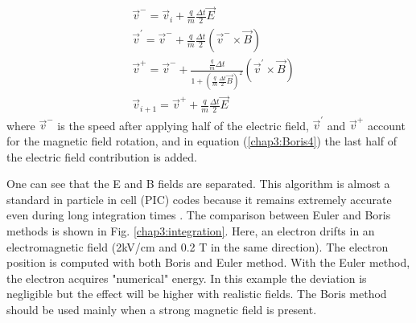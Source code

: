 \begin{refsection}
\begin{align}
     & \vec{v}^{-} = \vec{v}_{i} + \frac{q}{m} \frac{\Delta t}{2}\vec{E}                                                                 \\
     & \vec{v}^{'} = \vec{v}^{-} + \frac{q}{m} \frac{\Delta t}{2}(\vec{v}^{-} \times \vec{B})                                            \\
     & \vec{v}^{+} = \vec{v}^{-} + \frac{\frac{q}{m}\Delta t}{1+(\frac{q}{m} \frac{\Delta t}{2}\vec{B})^{2}}(\vec{v}^{'} \times \vec{B}) \\
     & \vec{v}_{i+1} = \vec{v}^{+} + \frac{q}{m} \frac{\Delta t}{2}\vec{E} \label{chap3:Boris4}
  \end{align}
  where $\vec{v}^{-}$ is the speed after applying half of the electric field, $\vec{v}^{'}$ and $\vec{v}^{+}$ account for the magnetic field rotation, and in equation (\ref{chap3:Boris4}) the last half of the electric field contribution is added.

  One can see that the E and B fields are separated. This algorithm is almost a standard in particle in cell (PIC) codes because it remains extremely accurate even during long integration times \cite{Qin2013}. The comparison between Euler and Boris methods is shown in Fig. \ref{chap3:integration}. Here, an electron drifts in an electromagnetic field (2kV/cm and 0.2 T in the same direction). The electron position is computed with both Boris and Euler method. With the Euler method, the electron acquires "numerical" energy. In this example the deviation is negligible but the effect will be higher with realistic fields. The Boris method should be used mainly when a strong magnetic field is present.


\end{refsection}

